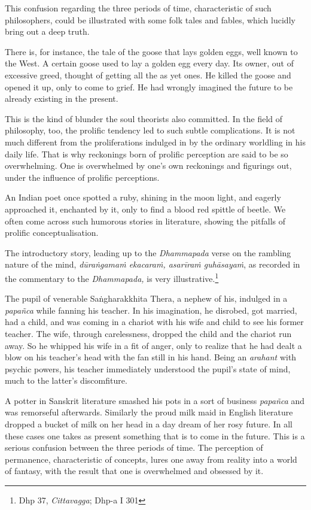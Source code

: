 This confusion regarding the three periods of time, characteristic of such philosophers, could be illustrated with some folk tales and fables, which lucidly bring out a deep truth.

There is, for instance, the tale of the goose that lays golden eggs, well known to the West. A certain goose used to lay a golden egg every day. Its owner, out of excessive greed, thought of getting all the as yet ones. He killed the goose and opened it up, only to come to grief. He had wrongly imagined the future to be already existing in the present.

This is the kind of blunder the soul theorists also committed. In the field of philosophy, too, the prolific tendency led to such subtle complications. It is not much different from the proliferations indulged in by the ordinary worldling in his daily life. That is why reckonings born of prolific perception are said to be so overwhelming. One is overwhelmed by one's own reckonings and figurings out, under the influence of prolific perceptions.

An Indian poet once spotted a ruby, shining in the moon light, and eagerly approached it, enchanted by it, only to find a blood red spittle of beetle. We often come across such humorous stories in literature, showing the pitfalls of prolific conceptualisation.

The introductory story, leading up to the \emph{Dhammapada} verse on the rambling nature of the mind, \emph{dūraṅgamaṁ ekacaraṁ, asarīraṁ guhāsayaṁ}, as recorded in the commentary to the \emph{Dhammapada,} is very illustrative.\footnote{Dhp 37, \emph{Cittavagga}; Dhp-a I 301}

The pupil of venerable Saṅgharakkhita Thera, a nephew of his, indulged in a \emph{papañca} while fanning his teacher. In his imagination, he disrobed, got married, had a child, and was coming in a chariot with his wife and child to see his former teacher. The wife, through carelessness, dropped the child and the chariot run away. So he whipped his wife in a fit of anger, only to realize that he had dealt a blow on his teacher's head with the fan still in his hand. Being an \emph{arahant} with psychic powers, his teacher immediately understood the pupil's state of mind, much to the latter's discomfiture.

A potter in Sanskrit literature smashed his pots in a sort of business \emph{papañca} and was remorseful afterwards. Similarly the proud milk maid in English literature dropped a bucket of milk on her head in a day dream of her rosy future. In all these cases one takes as present something that is to come in the future. This is a serious confusion between the three periods of time. The perception of permanence, characteristic of concepts, lures one away from reality into a world of fantasy, with the result that one is overwhelmed and obsessed by it.

